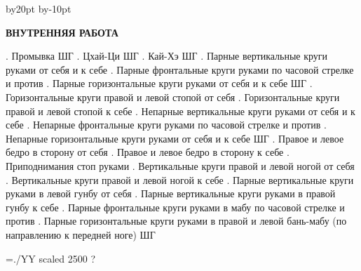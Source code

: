 \advance\hsize by20pt
\advance\pdfhorigin by-10pt
\nopagenumbers
\centerline{\bf ВНУТРЕННЯЯ РАБОТА}
\bigskip
\obeylines
\leavevmode{}. Промывка
ШГ
\leavevmode{}. Цхай-Ци
ШГ
\leavevmode{}. Кай-Хэ
ШГ
\leavevmode{}. Парные вертикальные круги руками от себя и к себе
\leavevmode{}. Парные фронтальные круги руками по часовой стрелке и против
\leavevmode{}. Парные горизонтальные круги руками от себя и к себе
ШГ
\leavevmode{}. Горизонтальные круги правой и левой стопой от себя
\leavevmode{}. Горизонтальные круги правой и левой стопой к себе
\leavevmode{}. Непарные вертикальные круги руками от себя и к себе
\leavevmode{}. Непарные фронтальные круги руками по часовой стрелке и против
\leavevmode{}. Непарные горизонтальные круги руками от себя и к себе
ШГ
\leavevmode{}. Правое и левое бедро в сторону от себя
\leavevmode{}. Правое и левое бедро в сторону к себе
\leavevmode{}. Приподнимания стоп руками
\leavevmode{}. Вертикальные круги правой и левой ногой от себя
\leavevmode{}. Вертикальные круги правой и левой ногой к себе
\leavevmode{}. Парные вертикальные круги руками в левой гунбу от себя
\leavevmode{}. Парные вертикальные круги руками в правой гунбу к себе
\leavevmode{}. Парные фронтальные круги руками в мабу по часовой стрелке и против
\leavevmode{}. Парные горизонтальные круги руками в правой и левой бань-мабу
\leavevmode\kern11pt (по направлению к передней ноге)
ШГ
\vfill
\centerline{\font\YY=./YY scaled 2500 \YY?}
\bye
